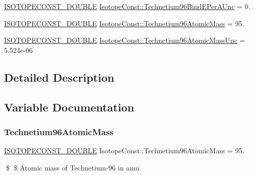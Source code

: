 \begin{DoxyCompactItemize}
\mbox{\hyperlink{group___isotope_const-_macros_ga8f45a7272ce02c0b4c65c44636ed719a}{I\+S\+O\+T\+O\+P\+E\+C\+O\+N\+S\+T\+\_\+\+D\+O\+U\+B\+LE}} \mbox{\hyperlink{group___isotope_const-_technetium-_tc96_gad678401ecba7becec3f5a7a6829f0a74}{Isotope\+Const\+::\+Technetium96\+Bind\+E\+Per\+A\+Unc}} = 0.
\item 
\mbox{\hyperlink{group___isotope_const-_macros_ga8f45a7272ce02c0b4c65c44636ed719a}{I\+S\+O\+T\+O\+P\+E\+C\+O\+N\+S\+T\+\_\+\+D\+O\+U\+B\+LE}} \mbox{\hyperlink{group___isotope_const-_technetium-_tc96_ga754e313084e8489d1e4ea9ee436def52}{Isotope\+Const\+::\+Technetium96\+Atomic\+Mass}} = 95.
\item 
\mbox{\hyperlink{group___isotope_const-_macros_ga8f45a7272ce02c0b4c65c44636ed719a}{I\+S\+O\+T\+O\+P\+E\+C\+O\+N\+S\+T\+\_\+\+D\+O\+U\+B\+LE}} \mbox{\hyperlink{group___isotope_const-_technetium-_tc96_gad8eef1e18029b2cb41f86e7141934bb0}{Isotope\+Const\+::\+Technetium96\+Atomic\+Mass\+Unc}} = 5.\+524e-\/06
\end{DoxyCompactItemize}


\subsection{Detailed Description}


\subsection{Variable Documentation}
\mbox{\label{group___isotope_const-_technetium-_tc96_ga754e313084e8489d1e4ea9ee436def52}} 
\subsubsection{\texorpdfstring{Technetium96\+Atomic\+Mass}{Technetium96AtomicMass}}
{\footnotesize\ttfamily \mbox{\hyperlink{group___isotope_const-_macros_ga8f45a7272ce02c0b4c65c44636ed719a}{I\+S\+O\+T\+O\+P\+E\+C\+O\+N\+S\+T\+\_\+\+D\+O\+U\+B\+LE}} Isotope\+Const\+::\+Technetium96\+Atomic\+Mass = 95.}

\$ \$ Atomic mass of Technetium-\/96 in amu. \mbox{\label{group___isotope_const-_technetium-_tc96_gad8eef1e18029b2cb41f86e7141934bb0}} 

